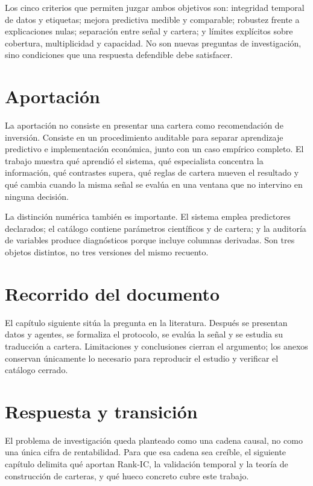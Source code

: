 Los cinco criterios que permiten juzgar ambos objetivos son: integridad temporal de datos y
etiquetas; mejora predictiva medible y comparable; robustez frente a explicaciones nulas;
separación entre señal y cartera; y límites explícitos sobre cobertura, multiplicidad y capacidad.
No son nuevas preguntas de investigación, sino condiciones que una respuesta defendible debe
satisfacer.

\section{Aportación}

La aportación no consiste en presentar una cartera como recomendación de inversión. Consiste en un
procedimiento auditable para separar aprendizaje predictivo e implementación económica, junto con
un caso empírico completo. El trabajo muestra qué aprendió el sistema, qué especialista concentra la
información, qué contrastes supera, qué reglas de cartera mueven el resultado y qué cambia cuando la
misma señal se evalúa en una ventana que no intervino en ninguna decisión.

La distinción numérica también es importante. El sistema emplea \NumPredictores{} predictores
declarados; el catálogo contiene \NumParametrosCatalogo{} parámetros científicos y de cartera; y la
auditoría de variables produce \NumDiagnosticos{} diagnósticos porque incluye columnas derivadas.
Son tres objetos distintos, no tres versiones del mismo recuento.

\section{Recorrido del documento}

El capítulo siguiente sitúa la pregunta en la literatura. Después se presentan datos y agentes, se
formaliza el protocolo, se evalúa la señal y se estudia su traducción a cartera. Limitaciones y
conclusiones cierran el argumento; los anexos conservan únicamente lo necesario para reproducir el
estudio y verificar el catálogo cerrado.

\section*{Respuesta y transición}

El problema de investigación queda planteado como una cadena causal, no como una única cifra de
rentabilidad. Para que esa cadena sea creíble, el siguiente capítulo delimita qué aportan Rank-IC,
la validación temporal y la teoría de construcción de carteras, y qué hueco concreto cubre este
trabajo.
